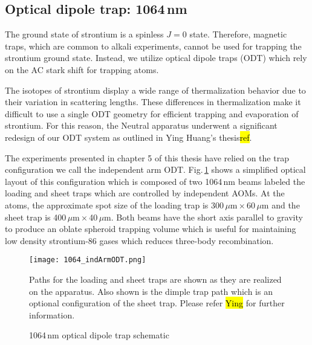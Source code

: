 
\pagebreak
\subsection{Optical dipole trap: 1064\,nm} \label{ssec:1064sys}
\setcounter{footnote}{0}
The ground state of strontium is a spinless $J=0$ state.
Therefore, magnetic traps, which are common to alkali experiments, cannot be used for trapping the strontium ground state.
Instead, we utilize optical dipole traps (ODT) which rely on the AC stark shift for trapping atoms.

The isotopes of strontium display a wide range of thermalization behavior due to their variation in scattering lengths.
These differences in thermalization make it difficult to use a single ODT geometry for efficient trapping and evaporation of strontium.
For this reason, the Neutral apparatus underwent a significant redesign of our ODT system as outlined in Ying Huang's thesis\hl{ref}.

The experiments presented in chapter 5 of this thesis have relied on the trap configuration we call the independent arm ODT.
Fig.\,\ref{fig:odtSchematic} shows a simplified optical layout of this configuration which is composed of two 1064\,nm beams labeled the loading and sheet traps which are controlled by independent AOMs.
At the atoms, the approximate spot size of the loading trap is 300\,$\mu$m\,$\times$\,60\,$\mu$m and the sheet trap is 400\,$\mu$m\,$\times$\,40\,$\mu$m.
Both beams have the short axis parallel to gravity to produce an oblate spheroid trapping volume which is useful for maintaining low density strontium-86 gases which reduces three-body recombination.
	\begin{figure} 
		\centerline{
		\texttt{[image: 1064\_indArmODT.png]}}
		\caption{1064\,nm optical dipole trap schematic}{Paths for the loading and sheet traps are shown as they are realized on the apparatus. Also shown is the dimple trap path which is an optional configuration of the sheet trap. Please refer \hl{Ying} for further information.}
		\label{fig:odtSchematic}
	\end{figure}

